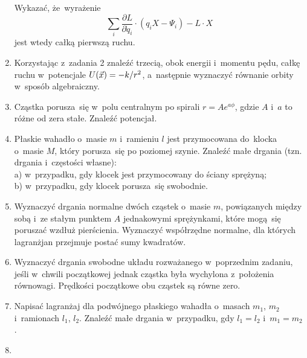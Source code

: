 \documentclass[a4paper,11pt]{article}
\begin{document}
\begin{enumerate}
  Wykazać, że~wyrażenie
  \begin{equation*}
    \sum_{ i } \frac{ \partial L }{ \partial \dot{q}_{ i } } \cdot ( q_{ i } X - \Psi_{ i } )
    - L \cdot X
  \end{equation*}
  jest wtedy całką pierwszą ruchu.



\item Korzystając z~zadania 2 znaleźć trzecią, obok energii i~momentu pędu,
  całkę ruchu w~potencjale $U( \vec{ x } ) = -k / r^{ 2 }$, a~następnie
  wyznaczyć równanie orbity w~sposób algebraiczny.



\item Cząstka porusza~się w~polu centralnym po spirali
  $r = A e^{ a \phi }$, gdzie $A$ i~$a$ to różne od zera stałe. Znaleźć
  potencjał.



\item Płaskie wahadło o~masie $m$ i~ramieniu $l$ jest przymocowana do~klocka
  o~masie $M$, który porusza~się po poziomej szynie. Znaleźć małe drgania
  (tzn. drgania i~częstości własne): \\
  a) w~przypadku, gdy klocek jest przymocowany do ściany sprężyną; \\
  b) w~przypadku, gdy klocek porusza~się swobodnie.



\item Wyznaczyć drgania normalne dwóch cząstek o~masie $m$, powiązanych
  między sobą i~ze stałym punktem $A$ jednakowymi sprężynkami, które
  mogą~się poruszać wzdłuż pierścienia. Wyznaczyć współrzędne normalne,
  dla których lagranżjan przejmuje postać sumy kwadratów.



\item Wyznaczyć drgania swobodne układu rozważanego w~poprzednim zadaniu,
  jeśli w~chwili początkowej jednak cząstka była wychylona z~położenia
  równowagi. Prędkości początkowe obu cząstek są równe zero.



\item Napisać lagranżaj dla podwójnego płaskiego wahadła o~masach
  $m_{ 1 }$, $m_{ 2 }$ i~ramionach $l_{ 1 }$, $l_{ 2 }$. Znaleźć małe
  drgania w~przypadku, gdy $l_{ 1 } = l_{ 2 }$ i~$m_{ 1 } = m_{ 2 }$.



\item




\end{enumerate}
\end{document}
